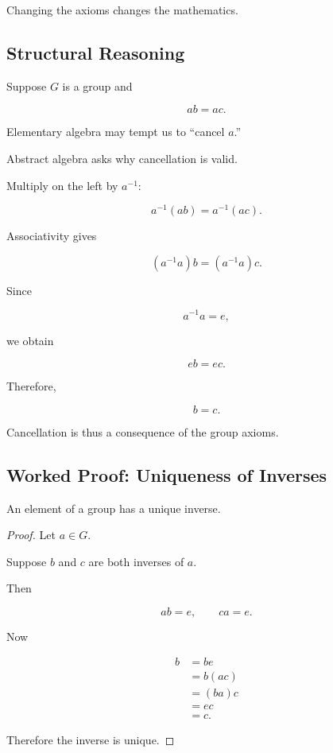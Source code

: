 Changing the axioms changes the mathematics.

\subsection{Structural Reasoning}
\label{subsec:structural-reasoning}

Suppose \(G\) is a group and

\[ ab=ac. \]

Elementary algebra may tempt us to ``cancel \(a\).''

Abstract algebra asks why cancellation is valid.

Multiply on the left by \(a^{-1}\):

\[ a^{-1}(ab)=a^{-1}(ac). \]

Associativity gives

\[ (a^{-1}a)b=(a^{-1}a)c. \]

Since

\[ a^{-1}a=e, \]

we obtain

\[ eb=ec. \]

Therefore,

\[ b=c. \]

Cancellation is thus a consequence of the group axioms.

\subsection{Worked Proof: Uniqueness of Inverses}
\label{subsec:uniqueness-inverses}

\begin{theorem}
An element of a group has a unique inverse.
\end{theorem}

\begin{proof}
Let \(a\in G\).

Suppose \(b\) and \(c\) are both inverses of \(a\).

Then

\[ ab=e,\qquad ca=e. \]

Now

\[
\begin{aligned}
b
&=be\\
&=b(ac)\\
&=(ba)c\\
&=ec\\
&=c.
\end{aligned}
\]

Therefore the inverse is unique.
\end{proof}

